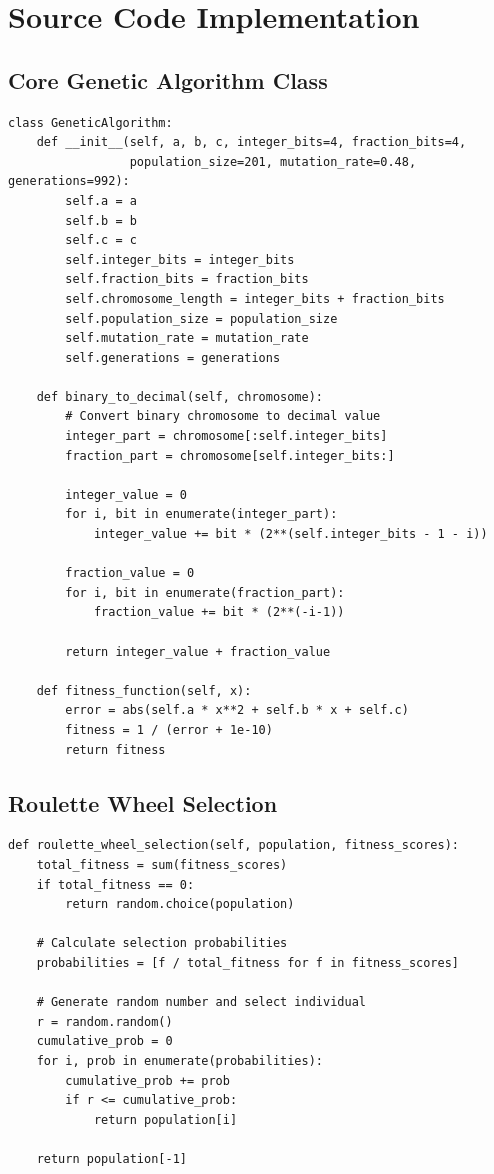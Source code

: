 \documentclass[11pt,a4paper]{article}
\begin{document}
\section{Source Code Implementation}

\subsection{Core Genetic Algorithm Class}

\begin{lstlisting}[style=pythoncode, caption=Main Genetic Algorithm Implementation]
class GeneticAlgorithm:
    def __init__(self, a, b, c, integer_bits=4, fraction_bits=4, 
                 population_size=201, mutation_rate=0.48, generations=992):
        self.a = a
        self.b = b  
        self.c = c
        self.integer_bits = integer_bits
        self.fraction_bits = fraction_bits
        self.chromosome_length = integer_bits + fraction_bits
        self.population_size = population_size
        self.mutation_rate = mutation_rate
        self.generations = generations
        
    def binary_to_decimal(self, chromosome):
        # Convert binary chromosome to decimal value
        integer_part = chromosome[:self.integer_bits]
        fraction_part = chromosome[self.integer_bits:]
        
        integer_value = 0
        for i, bit in enumerate(integer_part):
            integer_value += bit * (2**(self.integer_bits - 1 - i))
        
        fraction_value = 0
        for i, bit in enumerate(fraction_part):
            fraction_value += bit * (2**(-i-1))
            
        return integer_value + fraction_value
    
    def fitness_function(self, x):
        error = abs(self.a * x**2 + self.b * x + self.c)
        fitness = 1 / (error + 1e-10)
        return fitness
\end{lstlisting}

\subsection{Roulette Wheel Selection}

\begin{lstlisting}[style=pythoncode, caption=Roulette Wheel Selection Implementation]
def roulette_wheel_selection(self, population, fitness_scores):
    total_fitness = sum(fitness_scores)
    if total_fitness == 0:
        return random.choice(population)
    
    # Calculate selection probabilities
    probabilities = [f / total_fitness for f in fitness_scores]
    
    # Generate random number and select individual
    r = random.random()
    cumulative_prob = 0
    for i, prob in enumerate(probabilities):
        cumulative_prob += prob
        if r <= cumulative_prob:
            return population[i]
    
    return population[-1]
\end{lstlisting}
\end{document}
